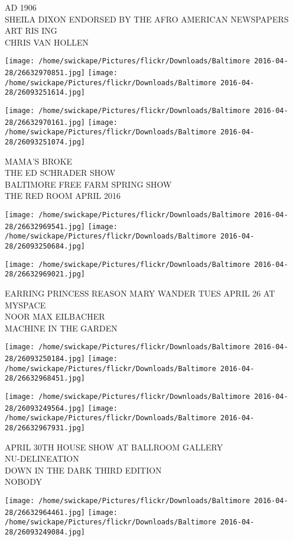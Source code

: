 \documentclass[10pt,letterpaper]{article}
\begin{document}
AD 1906\\
SHEILA DIXON ENDORSED BY THE AFRO AMERICAN NEWSPAPERS\\
ART RIS ING\\
CHRIS VAN HOLLEN
\pagebreak

\texttt{[image: /home/swickape/Pictures/flickr/Downloads/Baltimore 2016-04-28/26632970851.jpg]}
\texttt{[image: /home/swickape/Pictures/flickr/Downloads/Baltimore 2016-04-28/26093251614.jpg]}

\texttt{[image: /home/swickape/Pictures/flickr/Downloads/Baltimore 2016-04-28/26632970161.jpg]}
\texttt{[image: /home/swickape/Pictures/flickr/Downloads/Baltimore 2016-04-28/26093251074.jpg]}

MAMA'S BROKE\\
THE ED SCHRADER SHOW\\
BALTIMORE FREE FARM SPRING SHOW\\
THE RED ROOM APRIL 2016
\pagebreak

\texttt{[image: /home/swickape/Pictures/flickr/Downloads/Baltimore 2016-04-28/26632969541.jpg]}
\texttt{[image: /home/swickape/Pictures/flickr/Downloads/Baltimore 2016-04-28/26093250684.jpg]}

\vspace{0.25in}
\texttt{[image: /home/swickape/Pictures/flickr/Downloads/Baltimore 2016-04-28/26632969021.jpg]}

EARRING PRINCESS REASON MARY WANDER TUES APRIL 26 AT MYSPACE\\
NOOR MAX EILBACHER\\
MACHINE IN THE GARDEN
\pagebreak

\texttt{[image: /home/swickape/Pictures/flickr/Downloads/Baltimore 2016-04-28/26093250184.jpg]}
\texttt{[image: /home/swickape/Pictures/flickr/Downloads/Baltimore 2016-04-28/26632968451.jpg]}

\texttt{[image: /home/swickape/Pictures/flickr/Downloads/Baltimore 2016-04-28/26093249564.jpg]}
\texttt{[image: /home/swickape/Pictures/flickr/Downloads/Baltimore 2016-04-28/26632967931.jpg]}

APRIL 30TH HOUSE SHOW AT BALLROOM GALLERY\\
NU{-}DELINEATION\\
DOWN IN THE DARK THIRD EDITION\\
NOBODY
\pagebreak

\texttt{[image: /home/swickape/Pictures/flickr/Downloads/Baltimore 2016-04-28/26632964461.jpg]}
\texttt{[image: /home/swickape/Pictures/flickr/Downloads/Baltimore 2016-04-28/26093249084.jpg]}
\end{document}
